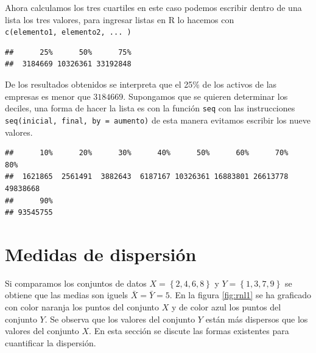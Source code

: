 \documentclass[]{book}
\newenvironment{Shaded}{\begin{snugshade}}{\end{snugshade}}
\newcommand{\KeywordTok}[1]{\textcolor[rgb]{0.13,0.29,0.53}{\textbf{#1}}}
\newcommand{\DataTypeTok}[1]{\textcolor[rgb]{0.13,0.29,0.53}{#1}}
\newcommand{\FloatTok}[1]{\textcolor[rgb]{0.00,0.00,0.81}{#1}}
\newcommand{\OperatorTok}[1]{\textcolor[rgb]{0.81,0.36,0.00}{\textbf{#1}}}
\newcommand{\NormalTok}[1]{#1}
\begin{document}
Ahora calculamos los tres cuartiles en este caso podemos escribir dentro
de una lista los tres valores, para ingresar listas en R lo hacemos con
\texttt{c(elemento1,\ elemento2,\ ...\ )}

\begin{Shaded}
\end{Shaded}

\begin{verbatim}
##      25%      50%      75% 
##  3184669 10326361 33192848
\end{verbatim}

De los resultados obtenidos se interpreta que el 25\% de los activos de
las empresas es menor que \(3 184 669\). Supongamos que se quieren
determinar los deciles, una forma de hacer la lista es con la función
\texttt{seq} con las instrucciones
\texttt{seq(inicial,\ final,\ by\ =\ aumento)} de esta manera evitamos
escribir los nueve valores.

\begin{Shaded}
\end{Shaded}

\begin{verbatim}
##      10%      20%      30%      40%      50%      60%      70%      80% 
##  1621865  2561491  3882643  6187167 10326361 16883801 26613778 49838668 
##      90% 
## 93545755
\end{verbatim}

\section{Medidas de dispersión}\label{medidas-de-dispersion}

Si comparamos los conjuntos de datos \(X=\left\{ 2,4,6,8 \right\}\) y
\(Y=\left\{1,3,7,9\right\}\) se obtiene que las medias son iguels
\(\bar{X}= \bar{Y}=5\). En la figura \ref{fig:rnl1} se ha graficado con
color naranja los puntos del conjunto \(X\) y de color azul los puntos
del conjunto \(Y\). Se observa que los valores del conjunto \(Y\) están
más dispersos que los valores del conjunto \(X\). En esta sección se
discute las formas existentes para cuantificar la dispersión.
\end{document}
